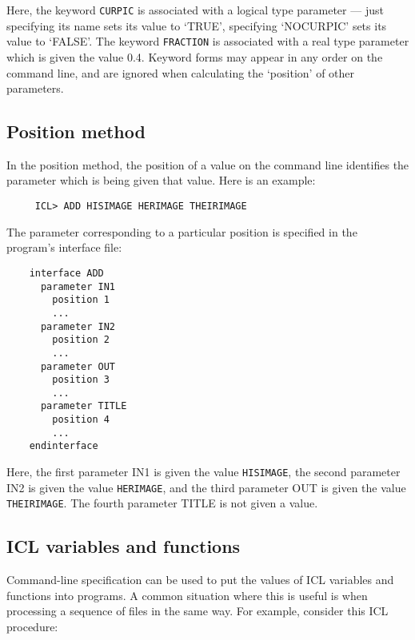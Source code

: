 Here, the keyword {\tt CURPIC} is associated with a logical type parameter ---
just specifying its name sets its value to `TRUE', specifying `NOCURPIC'
sets its value to `FALSE'.
The keyword {\tt FRACTION} is associated with a real type parameter which is
given the value 0.4.
Keyword forms may appear in any order on the command line, and are ignored
when calculating the `position' of other parameters.

\subsection{Position method}

In the position method, the position of a value on the command line identifies
the parameter which is being given that value.
Here is an example:

\begin{small}
\begin{verbatim}
     ICL> ADD HISIMAGE HERIMAGE THEIRIMAGE
\end{verbatim}
\end{small}

The parameter corresponding to a particular position is specified in the
program's interface file:

\begin{small}
\begin{verbatim}
    interface ADD
      parameter IN1
        position 1
        ...
      parameter IN2
        position 2
        ...
      parameter OUT
        position 3
        ...
      parameter TITLE
        position 4
        ...
    endinterface
\end{verbatim}
\end{small}

Here, the first parameter IN1 is given the value {\tt HISIMAGE},
the second parameter IN2 is given the value {\tt HERIMAGE}, and the third
parameter OUT is given the value {\tt THEIRIMAGE}.
The fourth parameter TITLE is not given a value.

\subsection{ICL variables and functions}

Command-line specification can be used to put the values of ICL variables
and functions into programs.
A common situation where this is useful is when processing a sequence of files
in the same way.
For example, consider this ICL procedure:

